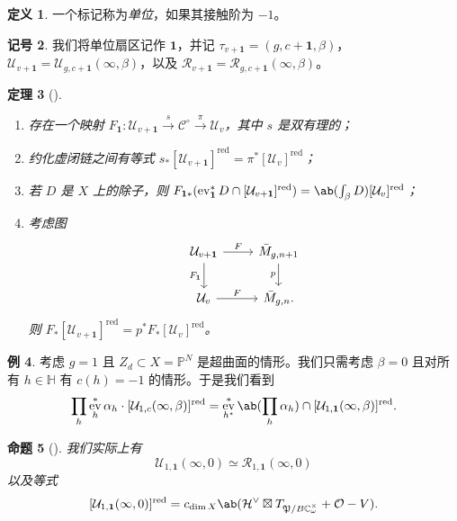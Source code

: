 \documentclass{amsart}
\newtheorem{thm}{定理}[section]
\newtheorem{prop}[thm]{命题}
\theoremstyle{definition}
\newtheorem{defn}[thm]{定义}
\newtheorem{exm}[thm]{例}
\newtheorem{notn}[thm]{记号}
\theoremstyle{remark}
\theoremstyle{plain}
\theoremstyle{definition}
\theoremstyle{remark}
\newcommand{\C}{\mathbb{C}}
\renewcommand{\H}{\mathbb{H}}
\renewcommand{\P}{\mathbb{P}}
\newcommand{\mc}[1]{\mathcal{#1}}
\newcommand{\mf}[1]{\mathfrak{#1}}
\newcommand{\mr}[1]{\mathrm{#1}}
\newcommand{\on}[1]{\operatorname{#1}}
\newcommand{\1}{\mathbf{1}}
\newcommand{\2}{\mathbf{2}}
\newcommand{\3}{\mathbf{3}}
\DeclareMathOperator{\ev}{ev}
\begin{document}
\begin{defn}
    一个标记称为\textit{单位}，如果其接触阶为 \(-1\)。
\end{defn}

\begin{notn}
    我们将单位扇区记作 \(\1\)，并记 \(\tau_{v+\1} = (g, c+\1, \beta)\)，\(\mc{U}_{v+\1} = \mc{U}_{g, c+\1}(\infty, \beta)\)，以及 \(\mc{R}_{v+\1} = \mc{R}_{g, c+\1}(\infty, \beta)\)。
\end{notn}

\begin{thm}[{\cite[定理~1.16--1.17]{CJRpunctured}}]\leavevmode
    \begin{enumerate}
        \item 存在一个映射 \(F_{\1} \colon \mc{U}_{v+\1} \xrightarrow{s} \mc{C}^{\circ} \xrightarrow{\pi} \mc{U}_v\)，其中 \(s\) 是双有理的；
        \item 约化虚闭链之间有等式 \(s_* [\mc{U}_{v+\1}]^{\on{red}} = \pi^* [\mc{U}_v]^{\on{red}}\)；
        \item 若 \(D\) 是 \(X\) 上的除子，则 \(F_{\1 *} (\ev_{\1}^* D \cap [\mc{U}_{v+\1}]^{\on{red}}) = \ab(\int_{\beta} D) [\mc{U}_v]^{\on{red}}\)；
        \item 考虑图
            \begin{equation*}
            \begin{tikzcd}
                \mc{U}_{v+\1} \ar{r}{F} \ar{d}[swap]{F_{\1}} & \bar{M}_{g,n+1} \ar{d}[swap]{p} \\
                \mc{U}_v \ar{r}{F} & \bar{M}_{g,n}.
            \end{tikzcd}
            \end{equation*}
            则 \(F_* [\mc{U}_{v+\1}]^{\on{red}} = p^* F_* [\mc{U}_v]^{\on{red}}\)。
    \end{enumerate}
\end{thm}

\begin{exm}
    考虑 \(g = 1\) 且 \(Z_d \subset X = \P^N\) 是超曲面的情形。我们只需考虑 \(\beta = 0\) 且对所有 \(h \in \H\) 有 \(c(h) = -1\) 的情形。于是我们看到
    \[ \prod_h \ev_h^* \alpha_h \cdot [\mc{U}_{1,c}(\infty,\beta)]^{\mr{red}} = \ev_{h^{\star}}^* \ab(\prod_h \alpha_h) \cap [\mc{U}_{1,\1}(\infty,\beta)]^{\on{red}}. \]
\end{exm}

\begin{prop}[{\cite{CJRpunctured}}]
    我们实际上有
    \[ \mc{U}_{1,\1}(\infty, 0) \simeq \mc{R}_{1,\1}(\infty, 0) \]
    以及等式
    \[ [\mc{U}_{1,\1}(\infty, 0)]^{\on{red}} = c_{\dim X} \ab(\mc{H}^{\vee} \boxtimes T_{\mf{P}/B\C_{\omega}^{\times}} + \mc{O} - V). \]
\end{prop}
\end{document}
